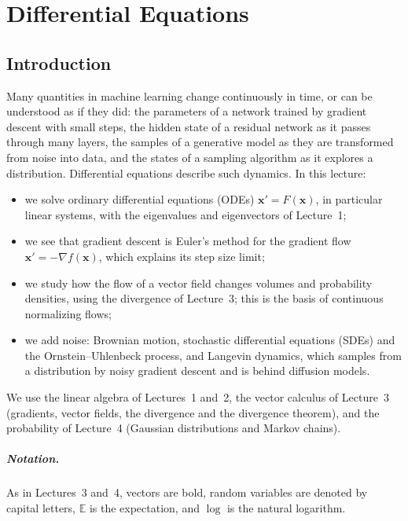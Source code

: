 \chapter{Differential Equations}\label{L5-chapter}
\begingroup
\section*{Introduction}

Many quantities in machine learning change continuously in time, or can be understood as if they did: the parameters of a network trained by gradient descent with small steps, the hidden state of a residual network as it passes through many layers, the samples of a generative model as they are transformed from noise into data, and the states of a sampling algorithm as it explores a distribution. Differential equations describe such dynamics. In this lecture:
\begin{itemize}
    \item we solve ordinary differential equations (ODEs) $\mathbf{x}' = F(\mathbf{x})$, in particular linear systems, with the eigenvalues and eigenvectors of Lecture~1;
    \item we see that gradient descent is Euler's method for the gradient flow $\mathbf{x}' = -\nabla f(\mathbf{x})$, which explains its step size limit;
    \item we study how the flow of a vector field changes volumes and probability densities, using the divergence of Lecture~3; this is the basis of continuous normalizing flows;
    \item we add noise: Brownian motion, stochastic differential equations (SDEs) and the Ornstein--Uhlenbeck process, and Langevin dynamics, which samples from a distribution by noisy gradient descent and is behind diffusion models.
\end{itemize}
We use the linear algebra of Lectures~1 and~2, the vector calculus of Lecture~3 (gradients, vector fields, the divergence and the divergence theorem), and the probability of Lecture~4 (Gaussian distributions and Markov chains).

\paragraph{Notation.} As in Lectures~3 and~4, vectors are bold, random variables are denoted by capital letters, $\mathbb{E}$ is the expectation, and $\log$ is the natural logarithm.

